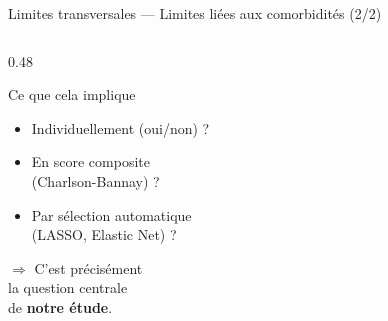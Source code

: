 \documentclass[aspectratio=169]{beamer}
\begin{document}
\begin{frame}{Limites transversales --- Limites liées aux comorbidités (2/2)}
\begin{columns}[T]
\begin{column}{0.48\textwidth}
\begin{block}{Ce que cela implique}
\begin{itemize}
          \item Individuellement (oui/non) ?
          \item En score composite\\
                (Charlson-Bannay) ?
          \item Par sélection automatique\\
                (LASSO, Elastic Net) ?
        \end{itemize}
        \vspace{6pt}
        $\Rightarrow$ C'est précisément\\
        la question centrale\\
        de \textbf{notre étude}.
      \end{block}
    \end{column}
  \end{columns}
\end{frame}
\end{document}
